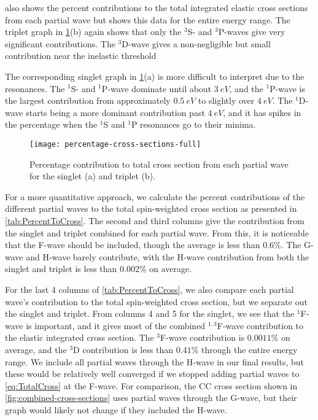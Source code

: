 \documentclass[Dissertation.tex]{subfiles}
\begin{document}
 also shows the percent contributions to 
the total integrated elastic cross sections from each partial wave but shows
this data for the entire energy range. The triplet graph in
\cref{fig:percentage-cross-sections-full}(b) again shows that only the $^3$S- and
$^3$P-waves give very significant contributions. The $^3$D-wave gives a
non-negligible but small contribution near the inelastic threshold

The corresponding singlet graph in \cref{fig:percentage-cross-sections-full}(a)
is more difficult to interpret due to the resonances. The $^1$S- and
$^1$P-wave dominate until about $\SI{3}{eV}$, and the $^1$P-wave is the largest 
contribution from approximately $\SI{0.5}{eV}$ to slightly over $\SI{4}{eV}$.
The $^1$D-wave starts being a more dominant contribution past $\SI{4}{eV}$, and
it has spikes in the percentage when the $^1$S and $^1$P resonances go to their
minima.

\begin{figure}[H]
	\centering
	\texttt{[image: percentage-cross-sections-full]}
	\caption[Percentage contribution to total cross section]{Percentage contribution to total cross section from each partial wave for the singlet (a) and triplet (b).}
	\label{fig:percentage-cross-sections-full}
\end{figure}

For a more quantitative approach, we calculate the percent contributions of the
different partial waves to the total spin-weighted cross section as presented
in \cref{tab:PercentToCross}. The second and third columns give the
contribution from the singlet and triplet combined for each partial wave. From
this, it is noticeable that the F-wave should be included, though the average
is less than $0.6\%$. The G-wave and H-wave barely contribute, with the H-wave
contribution from both the singlet and triplet is less than $0.002\%$ on 
average.

For the last 4 columns of \cref{tab:PercentToCross}, we also compare each
partial wave's contribution to the total spin-weighted cross section, but we
separate out the singlet and triplet. From columns 4 and 5 for the singlet,
we see that the $^1$F-wave is important, and it gives most of the combined
$^{1,3}$F-wave contribution to the elastic integrated cross section. The 
$^3$F-wave contribution is $0.0011\%$ on average, and the $^3$D contribution 
is less than $0.41\%$ through the entire energy range. We include all partial
waves through the H-wave in our final results, but these would be relatively
well converged if we stopped adding partial waves to \cref{eq:TotalCross} at
the F-wave. For comparison, the CC \cite{Walters2004} cross section shown in
\cref{fig:combined-cross-sections} uses partial waves through the G-wave, but
their graph would likely not change if they included the H-wave.
\end{document}
